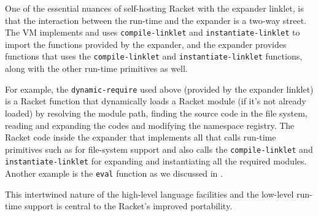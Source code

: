 One of the essential nuances of self-hosting Racket with the expander
linklet, is that the interaction between the run-time and the expander
is a two-way street. The VM implements and uses \verb|compile-linklet|
and \verb|instantiate-linklet| to import the functions provided by the
expander, and the expander provides functions that uses the
\verb|compile-linklet| and \verb|instantiate-linklet| functions, along
with the other run-time primitives as well.

For example, the \verb|dynamic-require| used above (provided by the
expander linklet) is a Racket function that dynamically loads a Racket
module (if it's not already loaded) by resolving the module path,
finding the source code in the file system, reading and expanding the
codes and modifying the namespace registry. The Racket code inside the
expander that implements all that calls run-time primitives such as
for file-system support and also calls the \verb|compile-linklet| and
\verb|instantiate-linklet| for expanding and instantiating all the
required modules. Another example is the \verb|eval| function as we
discussed in .

This intertwined nature of the high-level language facilities and the
low-level run-time support is central to the Racket's improved
portability.
